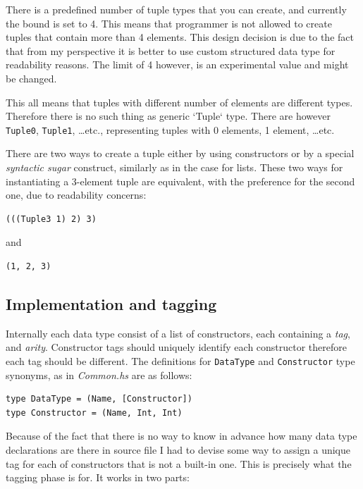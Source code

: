 \documentclass[12pt,a4paper]{report}
\begin{document}
There is a predefined number of tuple types that you can create, and currently
the bound is set to 4. This means that programmer is not allowed to create
tuples that contain more than 4 elements. This design decision is due to the
fact that from my perspective it is better to use custom structured data type
for readability reasons. The limit of 4 however, is an experimental value and
might be changed.

This all means that tuples with different number of elements are different
types. Therefore there is no such thing as generic `Tuple` type. There are
however \texttt{Tuple0}, \texttt{Tuple1}, \ldots etc., representing tuples with
0 elements, 1 element, \ldots etc.

There are two ways to create a tuple either by using constructors or by a
special \textit{syntactic sugar} construct, similarly as in the case for lists.
These two ways for instantiating a 3-element tuple are equivalent, with the
preference for the second one, due to readability concerns:

\vspace*{0.2in}
\begin{lstlisting}[style=haskell]
(((Tuple3 1) 2) 3)
\end{lstlisting}
and

\vspace*{0.2in}
\begin{lstlisting}[style=haskell]
(1, 2, 3)
\end{lstlisting}

\subsection{Implementation and tagging}
Internally each data type consist of a list of constructors, each containing a
\textit{tag}, and \textit{arity}. Constructor tags should uniquely identify
each constructor therefore each tag should be different. The definitions
for \texttt{DataType} and \texttt{Constructor} type synonyms, as in
\textit{Common.hs} are as follows:

\vspace*{0.2in}
\begin{lstlisting}[style=haskell]
type DataType = (Name, [Constructor])
type Constructor = (Name, Int, Int)
\end{lstlisting}

Because of the fact that there is no way to know in advance how many data type
declarations are there in source file I had to devise some way to assign a
unique tag for each of constructors that is not a built-in one. This is
precisely what the tagging phase is for. It works in two parts:
\end{document}
